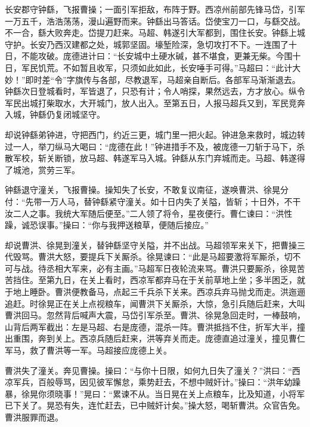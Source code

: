 长安郡守钟繇，飞报曹操；一面引军拒敌，布阵于野。西凉州前部先锋马岱，引军一万五千，浩浩荡荡，漫山遍野而来。钟繇出马答话。岱使宝刀一口，与繇交战。不一合，繇大败奔走。岱提刀赶来。马超、韩遂引大军都到，围住长安。钟繇上城守护。长安乃西汉建都之处，城郭坚固。壕堑险深，急切攻打不下。一连围了十日，不能攻破。庞德进计曰：“长安城中土硬水碱，甚不堪食，更兼无柴。今围十日，军民饥荒。不如暂且收军，只须如此如此，长安唾手可得。”马超曰：“此计大妙！”即时差“令”字旗传与各部，尽教退军，马超亲自断后。各部军马渐渐退去。钟繇次日登城看时，军皆退了，只恐有计；令人哨探，果然远去，方才放心。纵令军民出城打柴取水，大开城门，放人出入。至第五日，人报马超兵又到，军民竞奔入城，钟繇仍复闭城坚守。

却说钟繇弟钟进，守把西门，约近三更，城门里一把火起。钟进急来救时，城边转过一人，举刀纵马大喝曰：“庞德在此！”钟进措手不及，被庞德一刀斩于马下，杀散军校，斩关断锁，放马超、韩遂军马入城。钟繇从东门弃城而走。马超、韩遂得了城池，赏劳三军。

钟繇退守潼关，飞报曹操。操知失了长安，不敢复议南征，遂唤曹洪、徐晃分付：“先带一万人马，替钟繇紧守潼关。如十日内失了关隘，皆斩；十日外，不干汝二人之事。我统大军随后便至。”二人领了将令，星夜便行。曹仁谏曰：“洪性躁，诚恐误事。”操曰：“你与我押送粮草，便随后接应。”

却说曹洪、徐晃到潼关，替钟繇坚守关隘，并不出战。马超领军来关下，把曹操三代毁骂。曹洪大怒，要提兵下关厮杀。徐晃谏曰：“此是马超要激将军厮杀，切不可与战。待丞相大军来，必有主画。”马超军日夜轮流来骂。曹洪只要厮杀，徐晃苦苦挡住。至第九日，在关上看时，西凉军都弃马在于关前草地上坐；多半困乏，就于地上睡卧。曹洪便教备马，点起三千兵杀下关来。西凉兵弃马抛戈而走。洪迤逦追赶。时徐晃正在关上点视粮车，闻曹洪下关厮杀，大惊，急引兵随后赶来，大叫曹洪回马。忽然背后喊声大震，马岱引军杀至。曹洪、徐晃急回走时，一棒鼓响，山背后两军截出：左是马超、右是庞德，混杀一阵。曹洪抵挡不住，折军大半，撞出重围，奔到关上。西凉兵随后赶来，洪等弃关而走。庞德直追过潼关，撞见曹仁军马，救了曹洪等一军。马超接应庞德上关。

曹洪失了潼关。奔见曹操。操曰：“与你十日限，如何九日失了潼关？”洪曰：“西凉军兵，百般辱骂，因见彼军懈怠，乘势赶去，不想中贼奸计。”操曰：“洪年幼躁暴，徐晃你须晓事！”晃曰：“累谏不从。当日晃在关上点粮车，比及知道，小将军已下关了。晃恐有失，连忙赶去，已中贼奸计矣。”操大怒，喝斩曹洪。众官告免。曹洪服罪而退。

